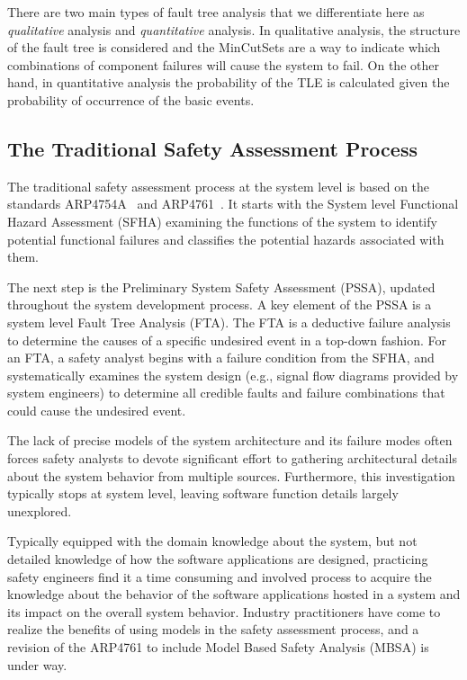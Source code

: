 There are two main types of fault tree analysis that we differentiate here as \textit{qualitative} analysis and \textit{quantitative} analysis. In qualitative analysis, the structure of the fault tree is considered and the MinCutSets are a way to indicate which combinations of component failures will cause the system to fail. On the other hand, in quantitative analysis the probability of the TLE is calculated given the probability of occurrence of the basic events. 

\subsection{The Traditional Safety Assessment Process}
\label{sec:saProcess}
The traditional safety assessment process at the system level is based on the standards ARP4754A~\cite{SAE:ARP4754A} and ARP4761~\cite{SAE:ARP4761}. It starts with the System level Functional Hazard Assessment (SFHA) examining the functions of the system to identify potential functional failures and classifies the potential hazards associated with them. 

The next step is the Preliminary System Safety Assessment (PSSA), updated throughout the system development process. A key element of the PSSA is a system level Fault Tree Analysis (FTA).  The FTA is a deductive failure analysis to determine the causes of a specific undesired event in a top-down fashion. For an FTA, a safety analyst begins with a failure condition from the SFHA, and systematically examines the system design (e.g., signal flow diagrams provided by system engineers) to determine all credible faults and failure combinations that could cause the undesired event. 

The lack of precise models of the system architecture and its failure modes often forces safety analysts to devote significant effort to gathering architectural details about the system behavior from multiple sources. Furthermore, this investigation typically stops at system level, leaving software function details largely unexplored.

Typically equipped with the domain knowledge about the system, but not detailed knowledge of how the software applications are designed, practicing safety engineers find it a time consuming and involved process to acquire the knowledge about the behavior of the software applications hosted in a system and its impact on the overall system behavior.
Industry practitioners have come to realize the benefits of using models in the safety assessment process, and a revision of the ARP4761 to include Model Based Safety Analysis (MBSA) is under way. %

